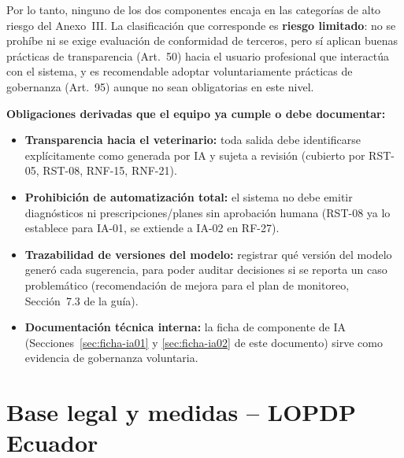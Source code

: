 Por lo tanto, ninguno de los dos componentes encaja en las categorías de alto riesgo del Anexo~III. La clasificación que corresponde es \textbf{riesgo limitado}: no se prohíbe ni se exige evaluación de conformidad de terceros, pero sí aplican buenas prácticas de transparencia (Art.\ 50) hacia el usuario profesional que interactúa con el sistema, y es recomendable adoptar voluntariamente prácticas de gobernanza (Art.\ 95) aunque no sean obligatorias en este nivel.

\textbf{Obligaciones derivadas que el equipo ya cumple o debe documentar:}

\begin{itemize}
  \item \textbf{Transparencia hacia el veterinario:} toda salida debe identificarse explícitamente como generada por IA y sujeta a revisión (cubierto por RST-05, RST-08, RNF-15, RNF-21).
  \item \textbf{Prohibición de automatización total:} el sistema no debe emitir diagnósticos ni prescripciones/planes sin aprobación humana (RST-08 ya lo establece para IA-01, se extiende a IA-02 en RF-27).
  \item \textbf{Trazabilidad de versiones del modelo:} registrar qué versión del modelo generó cada sugerencia, para poder auditar decisiones si se reporta un caso problemático (recomendación de mejora para el plan de monitoreo, Sección~7.3 de la guía).
  \item \textbf{Documentación técnica interna:} la ficha de componente de IA (Secciones~\ref{sec:ficha-ia01} y \ref{sec:ficha-ia02} de este documento) sirve como evidencia de gobernanza voluntaria.
\end{itemize}

\section{Base legal y medidas -- LOPDP Ecuador}
\label{sec:lopdp}

